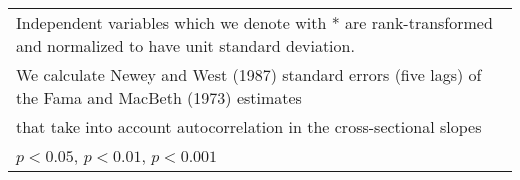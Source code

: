 {\begin{tabular}{l*{6}{c}}
\multicolumn{7}{l}{\footnotesize Independent variables which  we denote with * are rank-transformed and normalized to have unit standard deviation.}\\
\multicolumn{7}{l}{\footnotesize  We calculate Newey and West (1987) standard errors (five lags) of the Fama and MacBeth (1973) estimates }\\
\multicolumn{7}{l}{\footnotesize  that take into account autocorrelation in the cross-sectional slopes}\\
\multicolumn{7}{l}{\footnotesize \sym{*} \(p<0.05\), \sym{**} \(p<0.01\), \sym{***} \(p<0.001\)}\\
\end{tabular}
}

